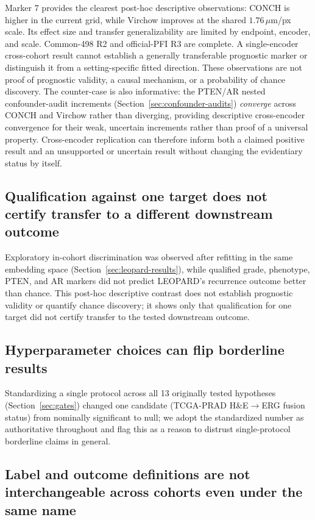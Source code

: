 Marker 7 provides the clearest post-hoc descriptive observations: CONCH is higher in
the current grid, while Virchow improves at the shared $1.76\,\mu$m/px scale. Its effect size
and transfer generalizability are limited by endpoint, encoder, and scale. Common-498 R2 and
official-PFI R3 are complete. A single-encoder cross-cohort
result cannot establish a generally transferable prognostic marker or distinguish it from a
setting-specific fitted direction. These observations are not proof of prognostic validity, a
causal mechanism, or a probability of chance discovery. The counter-case is also informative:
the PTEN/AR nested
confounder-audit increments (Section~\ref{sec:confounder-audits}) \emph{converge} across CONCH
and Virchow rather than diverging, providing descriptive cross-encoder convergence for their
weak, uncertain increments rather than proof of a universal property. Cross-encoder replication
can therefore inform both a claimed positive result and an unsupported or uncertain result
without changing the evidentiary status by itself.

\subsection{Qualification against one target does not certify transfer to a different downstream outcome}

Exploratory in-cohort discrimination was observed after refitting in the same embedding space
(Section~\ref{sec:leopard-results}), while qualified grade, phenotype, PTEN, and AR markers did
not predict LEOPARD's recurrence outcome better than chance. This post-hoc descriptive contrast
does not establish prognostic validity or quantify chance discovery; it shows only that
qualification for one target did not certify transfer to the tested downstream outcome.

\subsection{Hyperparameter choices can flip borderline results}

Standardizing a single protocol across all 13 originally tested hypotheses (Section~\ref{sec:gates})
changed one candidate (TCGA-PRAD H\&E$\to$ERG fusion status) from nominally significant to
null; we adopt the standardized number as authoritative throughout and flag this as a reason to
distrust single-protocol borderline claims in general.

\subsection{Label and outcome definitions are not interchangeable across cohorts even under the same name}

